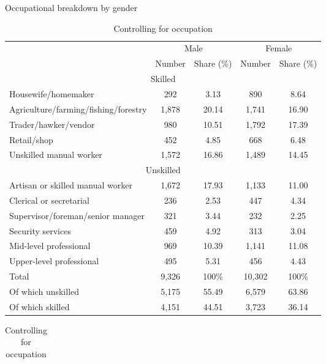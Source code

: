 \documentclass[12pt]{article}
\begin{document}
\begin{table}[htbp]
  \begin{adjustwidth}{-0.4in}{-0.4in}
  \centering
  \scriptsize
  \begin{minipage}[t]{0.65\textwidth}
    \caption{Occupational breakdown by gender}
    \label{tab:occupationstats}
    \begin{tabular}{l c c c c}
        \hline\hline 
        &    \multicolumn{2}{c}{Male} &    \multicolumn{2}{c}{Female} \\
    \cmidrule(lr){2-5}
    &   Number & Share (\%) &    Number & Share (\%)  \\
    \hline
    \multicolumn{5}{c}{Skilled}\\
    \hline
    Housewife/homemaker &292 &3.13 & 890& 8.64\\
    Agriculture/farming/fishing/forestry &1,878 & 20.14& 1,741& 16.90  \\
    Trader/hawker/vendor &980 & 10.51  & 1,792&  17.39 \\
    Retail/shop & 452&4.85 & 668&6.48 \\
    Unskilled manual worker & 1,572&16.86  & 1,489 & 14.45\\
    \hline
    \multicolumn{5}{c}{Unskilled}\\
    \hline
    Artisan or skilled manual worker &1,672 & 17.93&1,133 & 11.00 \\
    Clerical or secretarial & 236 & 2.53&  447& 4.34\\
    Supervisor/foreman/senior manager & 321 & 3.44&232  &2.25 \\
    Security services  & 459&4.92 & 313& 3.04 \\
    Mid-level professional & 969& 10.39& 1,141& 11.08\\
    Upper-level professional & 495&  5.31& 456& 4.43\\
    \hline
    Total   &    9,326 &           100\% & 10,302&           100\%\\
    Of which unskilled & 5,175 & 55.49 & 6,579 & 63.86 \\
    Of which skilled &4,151& 44.51 & 3,723& 36.14 \\
    \midrule
    \bottomrule
    \end{tabular}
    \end{minipage}
  \hfill
  \begin{minipage}[t]{0.45\textwidth}
      \caption{Controlling for occupation}
    \label{tab:occupcontrol}
    \begin{tabular}{lcc}
        \hline\hline

\end{tabular}
\end{minipage}
\end{adjustwidth}
\end{table}
\end{document}
